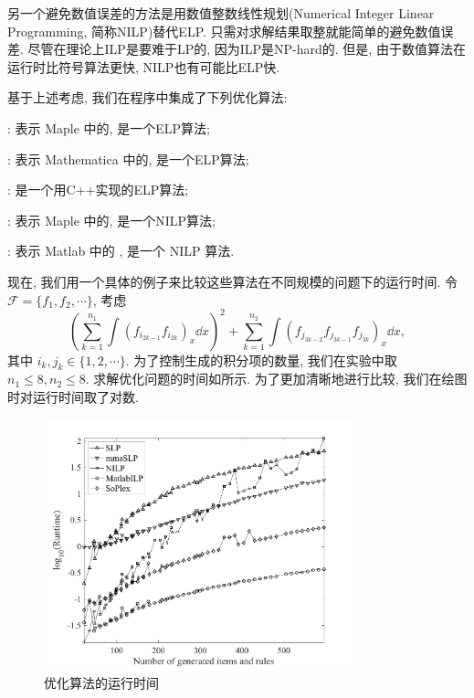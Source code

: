 另一个避免数值误差的方法是用数值整数线性规划(Numerical Integer Linear Programming, 简称NILP)替代ELP. 只需对求解结果取整就能简单的避免数值误差. 尽管在理论上ILP是要难于LP的, 因为ILP是NP-hard的. 但是, 由于数值算法在运行时比符号算法更快, NILP也有可能比ELP快. 

基于上述考虑, 我们在程序中集成了下列优化算法: 
\begin{compactitem}[\textbullet]
\item {}: 表示 Maple 中的, 是一个ELP算法; 
\item {}: 表示 Mathematica 中的, 是一个ELP算法;
\item {}\citep{soplex}: 是一个用C++实现的ELP算法;
\item {}: 表示 Maple 中的, 是一个NILP算法;
\item {}: 表示 Matlab 中的  , 是一个 NILP 算法.
\end{compactitem}

现在, 我们用一个具体的例子来比较这些算法在不同规模的问题下的运行时间. 令$\mathcal F=\{f_1,f_2,\cdots\}$, 考虑
\begin{equation}
\left(\sum\limits_{k=1}^{n_1}{\int\!{(f_{i_{2k-1}}f_{i_{2k}})_x\dd x}}\right)^2+\sum\limits_{k=1}^{n_2}{\int\!{(f_{j_{3k-2}}f_{j_{3k-1}}f_{j_{3k}})_x\dd x}},
\end{equation}
其中 $i_k,j_k \in \{1,2,\cdots\}$. 为了控制生成的积分项的数量, 我们在实验中取$n_1\le 8,n_2\le 8$. 求解优化问题的时间如所示. 为了更加清晰地进行比较, 我们在绘图时对运行时间取了对数. 

\begin{figure}[htb]
\centering
\includegraphics[width=0.8\textwidth]{fig/int-6.pdf}
\caption{优化算法的运行时间}\label{opts_log}
\label{opts_all}
\end{figure}


